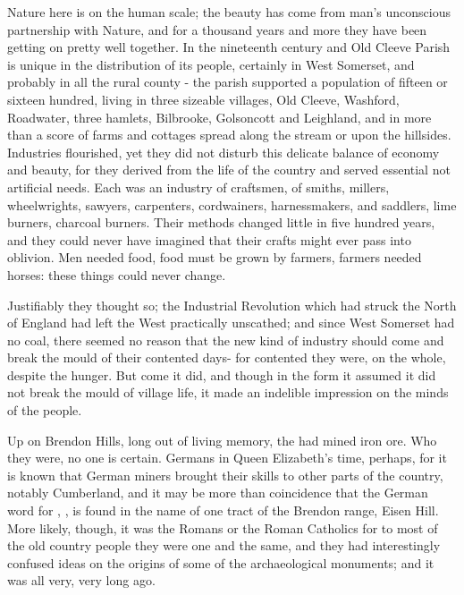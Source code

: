 Nature here is on the human scale; the beauty has come from man's unconscious partnership with Nature, and for a thousand years and more they have been getting on pretty well together. In the nineteenth century and Old Cleeve Parish is unique in the distribution of its people, certainly in West Somerset, and probably in all the rural county -  the parish supported a population of fifteen or sixteen hundred, living in three sizeable villages, Old Cleeve, Washford, Roadwater, three hamlets, Bilbrooke, Golsoncott and Leighland, and in more than a score of farms and cottages spread along the stream or upon the hillsides. Industries flourished, yet they did not disturb this delicate balance of economy and beauty, for they derived from the life of the country and served essential not artificial needs. Each was an industry of craftsmen, of smiths, millers, wheelwrights, sawyers, carpenters, cordwainers, harnessmakers, and saddlers, lime burners, charcoal burners. Their methods changed little in five hundred years, and they could never have imagined that their crafts might ever pass into oblivion. Men needed food, food must be grown by farmers, farmers needed horses: these things could never change.

Justifiably they thought so; the Industrial Revolution which had struck the North of England had left the West practically unscathed; and since West Somerset had no coal, there seemed no reason that the new kind of industry should come and break the mould of their contented days- for contented they were, on the whole, despite the hunger. But come it did, and though in the form it assumed it did not break the mould of village life, it made an indelible impression on the minds of the people. 

Up on Brendon Hills, long out of living memory, the  had mined iron ore. Who they were, no one is certain. Germans in Queen Elizabeth’s time, perhaps, for it is known that German miners brought their skills to other parts of the country, notably Cumberland, and it may be more than coincidence that the German word for , , is found in the name of one tract of the Brendon range, Eisen Hill.  More likely, though, it was the Romans or the Roman Catholics for to most of the old country people they were one and the same, and they had interestingly confused ideas on the origins of some of the archaeological monuments; and it was all very, very long ago.

